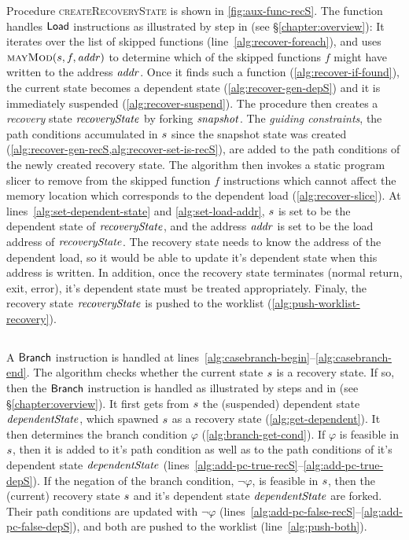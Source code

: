 Procedure \textsc{createRecoveryState} is shown in
\ref{fig:aux-func-recS}. The function handles $\mathsf{Load}$
instructions as illustrated by step  in 
(see \S\ref{chapter:overview}):
It iterates over the list of skipped
functions (line~\ref{alg:recover-foreach}), and uses
$\Call{mayMod}{\workstate, f, \addr}$ to determine which of the skipped
functions $f$ might have written to the address $\mathit{addr}$. Once it finds
such a function (\cref{alg:recover-if-found}), the current state
becomes a dependent state (\cref{alg:recover-gen-depS}) and it is
immediately suspended (\cref{alg:recover-suspend}). 
The procedure then creates a \emph{recovery} state $\mathit{recoveryState}$ by
forking $\mathit{snapshot}$.
The \textit{guiding constraints}, \ie  the path conditions accumulated in $s$
since the snapshot state was created (\cref{alg:recover-gen-recS,alg:recover-set-is-recS}),
are added to the path conditions of the newly created recovery state.
The algorithm then invokes a static program slicer to remove from the
skipped function $f$ instructions which cannot affect the memory location which corresponds to
the dependent load (\cref{alg:recover-slice}).
At lines~\ref{alg:set-dependent-state} and \ref{alg:set-load-addr},
$s$ is set to be the dependent state of $\mathit{recoveryState}$,
and the address $\mathit{addr}$ is set to be the load address of $\mathit{recoveryState}$.
The recovery state needs to know the address of the dependent load,
so it would be able to update it's dependent state when this address is written.
In addition, once the recovery state terminates (normal return, exit, error),
it's dependent state must be treated appropriately.
Finaly, the recovery state $\mathit{recoveryState}$ is pushed to the worklist (\cref{alg:push-worklist-recovery}).

\subsection{}
A $\mathsf{Branch}$ instruction is handled
at lines~\ref{alg:casebranch-begin}--\ref{alg:casebranch-end}.
The algorithm checks whether the current state $s$ is a recovery state.
If so, then the $\mathsf{Branch}$ instruction is
handled as illustrated by steps  and  in
 (see \S\ref{chapter:overview}).
It first gets from $s$ the (suspended) dependent state $\mathit{dependentState}$,
which spawned $s$ as a recovery state (\cref{alg:get-dependent}).
It then determines the branch condition $\varphi$ (\cref{alg:branch-get-cond}).
If $\varphi$ is feasible in $s$,
then it is added to it's path condition as well as to the path conditions
of it's dependent state $\mathit{dependentState}$ (lines~\ref{alg:add-pc-true-recS}--\ref{alg:add-pc-true-depS}).
If the negation of the branch condition, $\neg \varphi$, is feasible in $s$,
then the (current) recovery state $s$ and it's dependent state $\mathit{dependentState}$ are forked.
Their path conditions are updated with $\neg \varphi$ (lines~\ref{alg:add-pc-false-recS}--\ref{alg:add-pc-false-depS}),
and both are pushed to the worklist (line~\ref{alg:push-both}).

